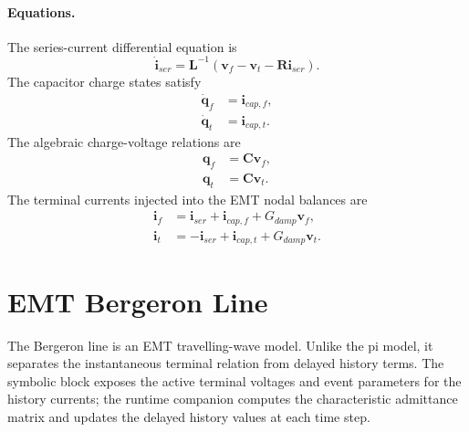 \paragraph{Equations.}
The series-current differential equation is
\begin{equation}
    \dot{\mathbf{i}}_{ser}
    = \mathbf{L}^{-1}\left(\mathbf{v}_f-\mathbf{v}_t-\mathbf{R}\mathbf{i}_{ser}\right).
\end{equation}
The capacitor charge states satisfy
\begin{align}
    \dot{\mathbf{q}}_f &= \mathbf{i}_{cap,f}, \\
    \dot{\mathbf{q}}_t &= \mathbf{i}_{cap,t}.
\end{align}
The algebraic charge-voltage relations are
\begin{align}
    \mathbf{q}_f &= \mathbf{C}\mathbf{v}_f, \\
    \mathbf{q}_t &= \mathbf{C}\mathbf{v}_t.
\end{align}
The terminal currents injected into the EMT nodal balances are
\begin{align}
    \mathbf{i}_f &= \mathbf{i}_{ser}+\mathbf{i}_{cap,f}+G_{damp}\mathbf{v}_f, \\
    \mathbf{i}_t &= -\mathbf{i}_{ser}+\mathbf{i}_{cap,t}+G_{damp}\mathbf{v}_t.
\end{align}

\section{EMT Bergeron Line}

The Bergeron line is an EMT travelling-wave model. Unlike the pi model, it separates the instantaneous terminal relation from delayed history terms. The symbolic block exposes the active terminal voltages and event parameters for the history currents; the runtime companion computes the characteristic admittance matrix and updates the delayed history values at each time step.

